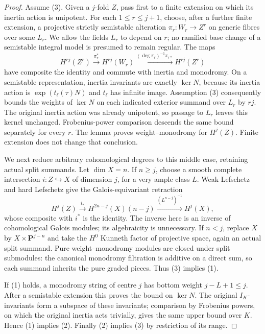 \begin{proof}
Assume (3).  Given a $j$-fold $Z$, pass first to a finite
extension on which its inertia action is unipotent.  For each
$1\leq r\leq j+1$, choose, after a further finite extension,
a projective strictly semistable alteration
$\pi_r:W_r\to Z^r$ on generic fibres over some $L_r$.
We allow the fields $L_r$ to depend on $r$; no ramified
base change of a semistable integral model is presumed to
remain regular.
The maps
\[
 H^{rj}(Z^r)\xrightarrow{\pi_r^*}H^{rj}(W_r)
 \xrightarrow{(\deg\pi_r)^{-1}\pi_{r*}}H^{rj}(Z^r)
\]
have composite the identity and commute with inertia and
monodromy.  On a semistable representation, inertia invariants
are exactly $\ker N$, because its inertia action is
$\exp(t_\ell(\tau)N)$ and $t_\ell$ has infinite image.
Assumption (3) consequently bounds the weights of
$\ker N$ on each indicated exterior summand over $L_r$ by $rj$.
The original inertia action was already unipotent, so passage
to $L_r$ leaves this kernel unchanged.  Frobenius-power
comparison descends the same bound separately for every $r$.
The lemma proves weight--monodromy for $H^j(Z)$.
Finite extension does not change that conclusion.

We next reduce arbitrary cohomological degrees to this middle
case, retaining actual split summands.  Let $\dim X=n$.
If $n\geq j$, choose a smooth complete intersection
$i:Z\hookrightarrow X$ of dimension $j$, for a very ample
class $L$.  Weak Lefschetz and hard Lefschetz give the
Galois-equivariant retraction
\[
 H^j(Z)\xrightarrow{i_*}
 H^{2n-j}(X)(n-j)
 \xrightarrow{(L^{n-j})^{-1}}H^j(X),
\]
whose composite with $i^*$ is the identity.  The inverse here
is an inverse of cohomological Galois modules; its algebraicity
is unnecessary.  If $n<j$, replace $X$ by
$X\times\mathbf P^{j-n}$ and take the $H^0$ Kunneth factor
of projective space, again an actual split summand.
Pure weight--monodromy modules are closed under split
submodules: the canonical monodromy filtration is additive
on a direct sum, so each summand inherits the pure graded
pieces.  Thus (3) implies (1).

If (1) holds, a monodromy string of centre $j$ has bottom
weight $j-L+1\leq j$.  After a semistable extension this proves
the bound on $\ker N$.  The original $I_K$-invariants form
a subspace of these invariants; comparison by Frobenius
powers, on which the original inertia acts trivially, gives
the same upper bound over $K$.  Hence (1) implies (2).
Finally (2) implies (3) by restriction of its range.
\end{proof}


